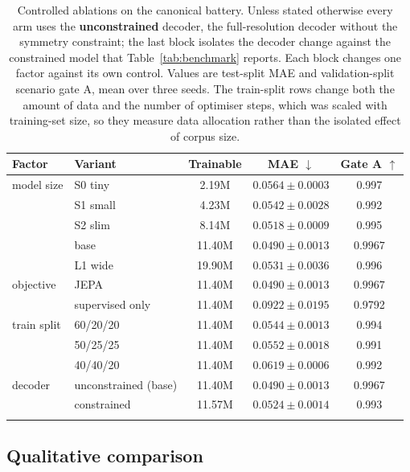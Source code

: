 \documentclass[pdflatex,oneside,sn-mathphys-num]{sn-jnl}
\theoremstyle{thmstyleone}
\theoremstyle{thmstyletwo}
\theoremstyle{thmstylethree}
\begin{document}
\begin{table}[h]
\centering
\caption{Controlled ablations on the canonical battery. Unless stated otherwise every arm
uses the \textbf{unconstrained} decoder, the full-resolution decoder without the symmetry
constraint; the last block isolates the decoder change against the constrained model that
Table~\ref{tab:benchmark} reports. Each block changes one factor against its own control.
Values are test-split MAE and validation-split scenario gate A, mean over three seeds.
The train-split rows change both the amount of data and the number of optimiser steps,
which was scaled with training-set size, so they measure data allocation rather than the
isolated effect of corpus size.}
\label{tab:ablation}
\begin{tabular}{@{}llccc@{}}
\toprule
Factor & Variant & Trainable & MAE $\downarrow$ & Gate A $\uparrow$ \\
\midrule
model size & S0 tiny & 2.19M & $0.0564 \pm 0.0003$ & 0.997 \\
 & S1 small & 4.23M & $0.0542 \pm 0.0028$ & 0.992 \\
 & S2 slim & 8.14M & $0.0518 \pm 0.0009$ & 0.995 \\
 & base & 11.40M & $\mathbf{0.0490 \pm 0.0013}$ & $\mathbf{0.9967}$ \\
 & L1 wide & 19.90M & $0.0531 \pm 0.0036$ & 0.996 \\
\midrule
objective & JEPA & 11.40M & $\mathbf{0.0490 \pm 0.0013}$ & $\mathbf{0.9967}$ \\
 & supervised only & 11.40M & $0.0922 \pm 0.0195$ & 0.9792 \\
\midrule
train split & 60/20/20 & 11.40M & $0.0544 \pm 0.0013$ & 0.994 \\
 & 50/25/25 & 11.40M & $0.0552 \pm 0.0018$ & 0.991 \\
 & 40/40/20 & 11.40M & $0.0619 \pm 0.0006$ & 0.992 \\
\midrule
decoder & unconstrained (base) & 11.40M & $0.0490 \pm 0.0013$ & 0.9967 \\
 & constrained & 11.57M & $0.0524 \pm 0.0014$ & 0.993 \\
\botrule
\end{tabular}
\end{table}

\subsection{Qualitative comparison}
\end{document}
